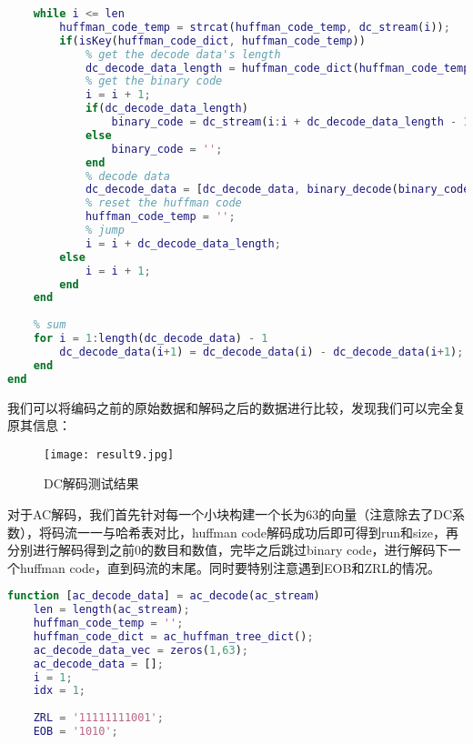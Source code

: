 \documentclass[a4paper]{article}
\begin{document}
\begin{enumerate}
\begin{lstlisting}[language=matlab, caption=dc decode]
    % diff decode
    while i <= len
        huffman_code_temp = strcat(huffman_code_temp, dc_stream(i));
        if(isKey(huffman_code_dict, huffman_code_temp))
            % get the decode data's length
            dc_decode_data_length = huffman_code_dict(huffman_code_temp);
            % get the binary code
            i = i + 1;
            if(dc_decode_data_length)
                binary_code = dc_stream(i:i + dc_decode_data_length - 1);
            else
                binary_code = '';
            end
            % decode data
            dc_decode_data = [dc_decode_data, binary_decode(binary_code)];
            % reset the huffman code
            huffman_code_temp = ''; 
            % jump
            i = i + dc_decode_data_length;
        else
            i = i + 1;
        end
    end
    
    % sum
    for i = 1:length(dc_decode_data) - 1
        dc_decode_data(i+1) = dc_decode_data(i) - dc_decode_data(i+1);
    end
end
    \end{lstlisting}
    
    \par 我们可以将编码之前的原始数据和解码之后的数据进行比较，发现我们可以完全复原其信息：
    \begin{figure}[ht]
        \centering
        \texttt{[image: result9.jpg]}
        \caption{DC解码测试结果}
        \label{fig:result 9}
    \end{figure}
    
    \par 对于AC解码，我们首先针对每一个小块构建一个长为63的向量（注意除去了DC系数），将码流一一与哈希表对比，huffman code解码成功后即可得到run和size，再分别进行解码得到之前0的数目和数值，完毕之后跳过binary code，进行解码下一个huffman code，直到码流的末尾。同时要特别注意遇到EOB和ZRL的情况。
    
    \begin{lstlisting}[language=matlab, caption=ac decode]
function [ac_decode_data] = ac_decode(ac_stream)
    len = length(ac_stream);
    huffman_code_temp = '';
    huffman_code_dict = ac_huffman_tree_dict();
    ac_decode_data_vec = zeros(1,63);
    ac_decode_data = [];
    i = 1;
    idx = 1;
    
    ZRL = '11111111001';
    EOB = '1010';
    

\end{lstlisting}
\end{enumerate}
\end{document}

